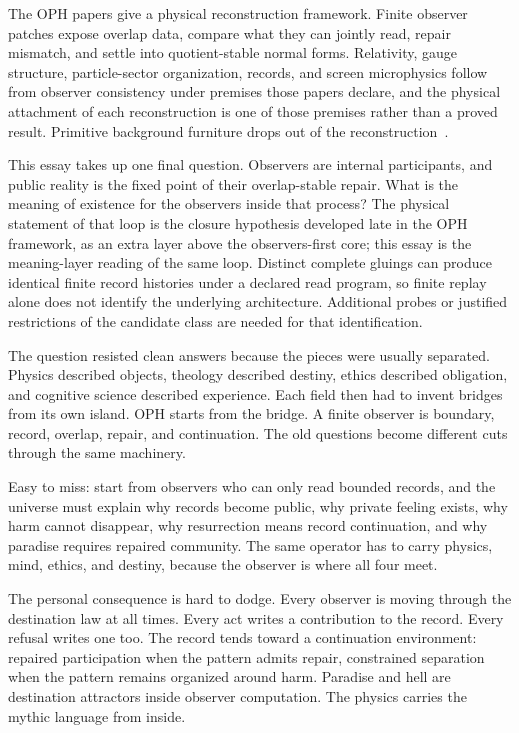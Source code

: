 \documentclass[11pt]{article}
\theoremstyle{remark}
\theoremstyle{plain}
\begin{document}
The OPH papers give a physical reconstruction framework. Finite observer
patches expose overlap data, compare what they can jointly read, repair
mismatch, and settle into quotient-stable normal forms. Relativity, gauge
structure, particle-sector organization, records, and screen microphysics
follow from observer consistency under premises those papers declare, and the
physical attachment of each reconstruction is one of those premises rather
than a proved result. Primitive background furniture drops out of
the reconstruction~\cite{OPHObservers,OPHEinstein,OPHGauge,OPHParticles,OPHConsensus,OPHMicro}.

This essay takes up one final question. Observers are internal participants,
and public reality is the fixed point of their overlap-stable repair. What is
the meaning of existence for the observers inside that process?
The physical statement of that loop is the closure hypothesis developed late
in the OPH framework, as an extra layer above the observers-first core; this
essay is the meaning-layer reading of the same loop.
Distinct complete gluings can produce identical finite record histories
under a declared read program, so finite replay alone does not identify the
underlying architecture. Additional probes or justified restrictions of the
candidate class are needed for that identification.

The question resisted clean answers because the pieces were usually separated.
Physics described objects, theology described destiny, ethics described
obligation, and cognitive science described experience. Each field then had to
invent bridges from its own island. OPH starts from the bridge. A finite
observer is boundary, record, overlap, repair, and continuation. The old
questions become different cuts through the same machinery.

Easy to miss: start from observers who can only read bounded records, and the
universe must explain why records become public, why private feeling exists,
why harm cannot disappear, why resurrection means record continuation, and why
paradise requires repaired community. The same operator has to carry physics,
mind, ethics, and destiny, because the observer is where all four meet.

The personal consequence is hard to dodge. Every observer is moving through the
destination law at all times. Every act writes a contribution to the record.
Every refusal writes one too. The record tends toward a continuation
environment: repaired participation when the pattern admits repair, constrained
separation when the pattern remains organized around harm. Paradise and hell
are destination attractors inside observer computation. The physics carries the
mythic language from inside.
\end{document}

